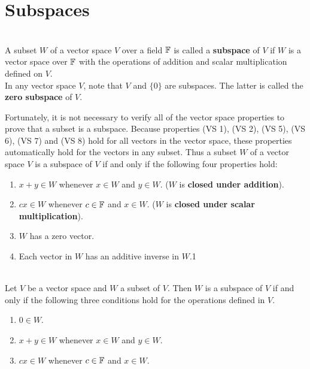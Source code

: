 \section{Subspaces}

\begin{definition}
	\hfill\\
	A subset $W$ of a vector space $V$ over a field $\mathbb{F}$ is called a \textbf{subspace} of $V$ if $W$ is a vector space over $\mathbb{F}$ with the operations of addition and scalar multiplication defined on $V$.\\
	
	In any vector space $V$, note that $V$ and $\{0\}$ are subspaces. The latter is called the \textbf{zero subspace} of $V$.
	
	Fortunately, it is not necessary to verify all of the vector space properties to prove that a subset is a subspace. Because properties (VS 1), (VS 2), (VS 5), (VS 6), (VS 7) and (VS 8) hold for all vectors in the vector space, these properties automatically hold for the vectors in any subset. Thus a subset $W$ of a vector space $V$ is a subspace of $V$ if and only if the following four properties hold:
	
	\begin{enumerate}
		\item $x + y \in W$ whenever $x \in W$ and $y \in W$. ($W$ is \textbf{closed under addition}).
		\item $cx \in W$ whenever $c \in \mathbb{F}$ and $x \in W$. ($W$ is \textbf{closed under scalar multiplication}).
		\item $W$ has a zero vector.
		\item Each vector in $W$ has an additive inverse in $W$.1
	\end{enumerate}
\end{definition}

\begin{theorem}
	\hfill\\
	Let $V$ be a vector space and $W$ a subset of $V$. Then $W$ is a subspace of $V$ if and only if the following three conditions hold for the operations defined in $V$.
	
	\begin{enumerate}
		\item $0 \in W$.
		\item $x + y \in W$ whenever $x \in W$ and $y \in W$.
		\item $cx \in W$ whenever $c \in \mathbb{F}$ and $x \in W$.
	\end{enumerate}
\end{theorem}

